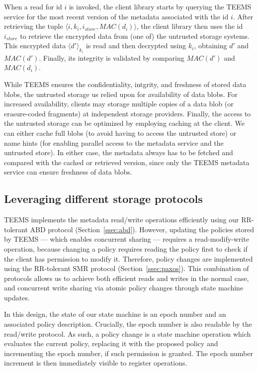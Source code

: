 When a read for id $i$ is invoked, the client library starts by
querying the \ac{TEEMS} service for the most recent version of the
metadata associated with the id $i$. After retrieving the tuple
$\langle i,k_i,i_{store},MAC(d_i) \rangle$, the client library
then uses the id $i_{store}$ to retrieve the encrypted data from
(one of) the untrusted storage systems. This encrypted data
$\langle d'\rangle_{k_i}$ is read and then decrypted using $k_i$,
obtaining $d'$ and $MAC(d')$. Finally, its integrity  is
validated by comparing $MAC(d')$ and $MAC(d_i)$.

While \ac{TEEMS} ensures the confidentiality, intgrity, and freshness of
stored data blobs, the untrusted storage us relied upon for
availability of data blobs. For increased availability, clients may
storage multiple copies of a data blob (or erasure-coded fragments) at
independent storage providers.
%
Finally, the access to the untrusted storage can be optimized by
employing caching at the client. We can either cache full blobs (to
avoid having to access the untrusted store) or name hints (for
enabling parallel access to the metadata service and the untrusted
store).  In either case, the metadata always has to be fetched and
compared with the cached or retrieved version, since only the
\ac{TEEMS} metadata service can ensure freshness of data blobs.

\subsection{Leveraging different storage protocols}

\ac{TEEMS} implements the metadata read/write operations efficiently using
our \ac{RR}-tolerant ABD protocol (Section~\ref{ssec:abd}).  However,
updating the policies stored by \ac{TEEMS} --- which enables concurrent
 sharing --- requires a read-modify-write operation, because changing
a policy requires reading the policy first to check if the client has
permission to modify it.  Therefore, policy changes are implemented
using the \ac{RR}-tolerant SMR protocol
(Section~\ref{ssec:paxos}).  This combination of protocols allows us
to achieve both efficient reads and writes in the normal case, and
concurrent write sharing via atomic policy changes through state
machine updates.

In this design, the state of our state machine is an epoch number
and an associated policy description. Crucially, the
epoch number is also readable by the read/write protocol. As
such, a policy change is a state machine operation which
evaluates the current policy, replacing it with the proposed
policy and incrementing the epoch number, if such permission is
granted. The epoch number increment is then immediately
visible to register operations.

